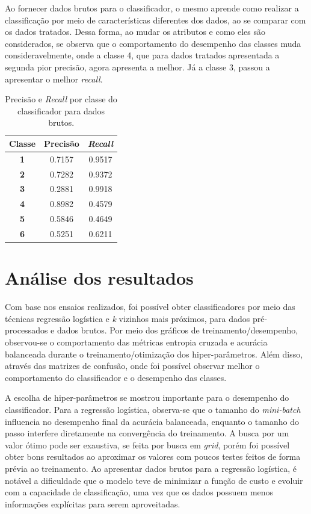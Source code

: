 Ao fornecer dados brutos para o classificador, o mesmo aprende como realizar a classificação por meio de características diferentes dos dados, ao se comparar com os dados tratados. Dessa forma, ao mudar os atributos e como eles são considerados, se observa que o comportamento do desempenho das classes muda consideravelmente, onde a classe 4, que para dados tratados apresentada a segunda pior precisão, agora apresenta a melhor. Já a classe 3, passou a apresentar o melhor \textit{recall}.

\begin{table}[H]
	\centering
	\begin{tabular}{c|c|c}
		\textbf{Classe} & \textbf{Precisão} & \textit{\textbf{Recall}} \\ \hline
		\textbf{1}      & 0.7157            & 0.9517                   \\
		\textbf{2}      & 0.7282            & 0.9372                   \\
		\textbf{3}      & 0.2881            & 0.9918                   \\
		\textbf{4}      & 0.8982            & 0.4579                   \\
		\textbf{5}      & 0.5846            & 0.4649                   \\
		\textbf{6}      & 0.5251            & 0.6211                  
	\end{tabular}
	\caption{Precisão e \textit{Recall} por classe do classificador para dados brutos.}
	\label{tab:pr_knn_2}
\end{table}

\clearpage
\section{Análise dos resultados}

Com base nos ensaios realizados, foi possível obter classificadores por meio das técnicas regressão logística e \textit{k} vizinhos mais próximos, para dados pré-processados e dados brutos. Por meio dos gráficos de treinamento/desempenho, observou-se o comportamento das métricas entropia cruzada e acurácia balanceada durante o treinamento/otimização dos hiper-parâmetros. Além disso, através das matrizes de confusão, onde foi possível observar melhor o comportamento do classificador e o desempenho das classes.


A escolha de hiper-parâmetros se mostrou importante para o desempenho do classificador. Para a regressão logística, observa-se que o tamanho do \textit{mini-batch} influencia no desempenho final da acurácia balanceada, enquanto o tamanho do passo interfere diretamente na convergência do treinamento. A busca por um valor ótimo pode ser exaustiva, se feita por busca em \textit{grid}, porém foi possível obter bons resultados ao aproximar os valores com poucos testes feitos de forma prévia ao treinamento. Ao apresentar dados brutos para a regressão logística, é notável a dificuldade que o modelo teve de minimizar a função de custo e evoluir com a capacidade de classificação, uma vez que os dados possuem menos informações explícitas para serem aproveitadas.


